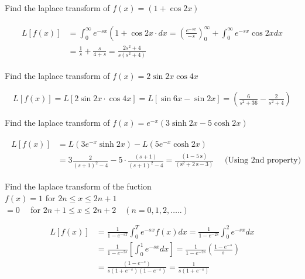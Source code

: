 \begin{exercise}
	Find the laplace transform of $f(x)=(1+\cos 2 x)$
\end{exercise}
\begin{answer}
	\begin{align*}
	\begin{aligned}
	L[f(x)] &=\int_{0}^{\infty} e^{-s x}\left(1+\cos 2 x \cdot d x=\left(\frac{e^{-s x}}{-s}\right)_{0}^{\infty}+\int_{0}^{\infty} e^{-s x} \cos 2 x d x\right.\\
	&=\frac{1}{s}+\frac{s}{4+s}=\frac{2 s^{2}+4}{s\left(s^{2}+4\right)}
	\end{aligned}
	\end{align*}
\end{answer}
\begin{exercise}
	Find the laplace transform of $f(x)=2 \sin 2 x \cos 4 x$
\end{exercise}
\begin{answer}
	\begin{align*}
	L[f(x)]=L[2 \sin 2 x \cdot \cos 4 x]=L[\sin 6 x-\sin 2 x]=\left(\frac{6}{s^{2}+36}-\frac{2}{s^{2}+4}\right)
	\end{align*}
\end{answer}
\begin{exercise}
Find the laplace transform of $f(x)=e^{-x}(3 \sinh 2 x-5 \cosh 2 x)$
\end{exercise}
\begin{answer}
	\begin{align*}
	\begin{aligned}
	L[f(x)] &=L\left(3 e^{-x} \sinh 2 x\right)-L\left(5 e^{-x} \cosh 2 x\right) \\
	&=3 \frac{2}{(s+1)^{2}-4}-5 \cdot \frac{(s+1)}{(s+1)^{2}-4}=\frac{(1-5 \mathrm{~s})}{\left(\mathrm{s}^{2}+2 \mathrm{~s}-3\right)} \quad \text { (Using 2nd property) }
	\end{aligned}
	\end{align*}
\end{answer}
\begin{exercise}
	Find the laplace transform of the fuction\\
	$f(x)=1$ for $2 n \leq x \leq 2 n+1$\\
	$=0 \quad$ for $2 n+1 \leq x \leq 2 n+2 \quad(n=0,1,2, \ldots . .)$
\end{exercise}
\begin{answer}
	\begin{align*}
	L[f(x)] &=\frac{1}{1-e^{-s T}} \int_{0}^{T} e^{-s x} f(x) d x=\frac{1}{1-e^{-2 s}} \int_{0}^{2} e^{-s x} d x \\
	&=\frac{1}{1-e^{-2 s}}\left[\int_{0}^{1} e^{-s x} d x\right]=\frac{1}{1-e^{-2 s}}\left(\frac{1-e^{-s}}{s}\right)\\
	&=\frac{\left(1-e^{-s}\right)}{s\left(1+e^{-s}\right)\left(1-e^{-s}\right)}=\frac{1}{s\left(1+e^{-s}\right)}
	\end{align*}
\end{answer}
